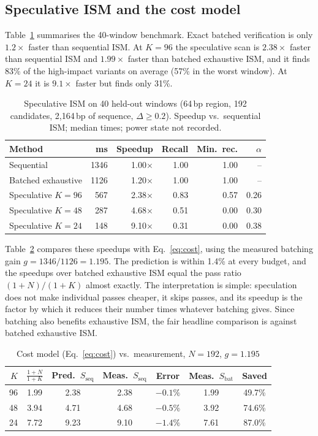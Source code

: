 \documentclass[conference]{IEEEtran}
\begin{document}
\subsection{Speculative ISM and the cost model}
Table~\ref{tab:spec} summarises the 40-window benchmark. Exact batched verification is only $1.2\times$ faster than sequential ISM. At $K=96$ the speculative scan is $2.38\times$ faster than sequential ISM and $1.99\times$ faster than batched exhaustive ISM, and it finds 83\% of the high-impact variants on average (57\% in the worst window). At $K=24$ it is $9.1\times$ faster but finds only 31\%.

\begin{table}[t]
\centering
\caption{Speculative ISM on 40 held-out windows (64\,bp region, 192 candidates, 2{,}164\,bp of sequence, $\Delta\ge0.2$). Speedup vs.\ sequential ISM; median times; power state not recorded.}
\label{tab:spec}
\setlength{\tabcolsep}{4pt}
\begin{tabular}{lrrrrr}
\toprule
Method & ms & Speedup & Recall & Min.\ rec. & $\alpha$ \\
\midrule
Sequential & 1346 & 1.00$\times$ & 1.00 & 1.00 & -- \\
Batched exhaustive & 1126 & 1.20$\times$ & 1.00 & 1.00 & -- \\
Speculative $K{=}96$ & 567 & 2.38$\times$ & 0.83 & 0.57 & 0.26 \\
Speculative $K{=}48$ & 287 & 4.68$\times$ & 0.51 & 0.00 & 0.30 \\
Speculative $K{=}24$ & 148 & 9.10$\times$ & 0.31 & 0.00 & 0.38 \\
\bottomrule
\end{tabular}
\end{table}

Table~\ref{tab:cost} compares these speedups with Eq.~\eqref{eq:cost}, using the measured batching gain $g=1346/1126=1.195$. The prediction is within 1.4\% at every budget, and the speedups over batched exhaustive ISM equal the pass ratio $(1+N)/(1+K)$ almost exactly. The interpretation is simple: speculation does not make individual passes cheaper, it skips passes, and its speedup is the factor by which it reduces their number times whatever batching gives. Since batching also benefits exhaustive ISM, the fair headline comparison is against batched exhaustive ISM.

\begin{table}[t]
\centering
\caption{Cost model (Eq.~\ref{eq:cost}) vs.\ measurement, $N=192$, $g=1.195$}
\label{tab:cost}
\setlength{\tabcolsep}{3.2pt}
\begin{tabular}{rcccccc}
\toprule
$K$ & $\frac{1+N}{1+K}$ & Pred.\ $S_{\mathrm{seq}}$ & Meas.\ $S_{\mathrm{seq}}$ & Error & Meas.\ $S_{\mathrm{bat}}$ & Saved \\
\midrule
96 & 1.99 & 2.38 & 2.38 & $-0.1\%$ & 1.99 & 49.7\% \\
48 & 3.94 & 4.71 & 4.68 & $-0.5\%$ & 3.92 & 74.6\% \\
24 & 7.72 & 9.23 & 9.10 & $-1.4\%$ & 7.61 & 87.0\% \\
\bottomrule
\end{tabular}
\end{table}
\end{document}
